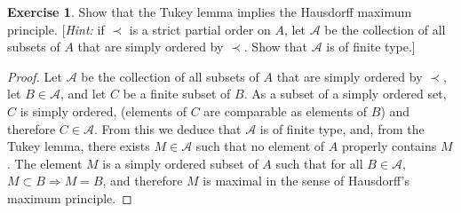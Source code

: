 \documentclass[11pt,a4paper,twoside]{article}
\theoremstyle{definition}
\newcounter{excounter}
\newtheorem{exercise}[excounter]{Exercise}
\begin{document}
\begin{exercise}

  Show that the Tukey lemma implies the Hausdorff maximum principle. [\emph{Hint:} if
  $\prec$ is a strict partial order on $A$, let $\mathscr{A}$ be the collection of all
  subsets of $A$ that are simply ordered by $\prec$. Show that $\mathscr{A}$ is of
  finite type.]

\end{exercise}

\begin{proof}

  Let $\mathscr{A}$ be the collection of all subsets of $A$ that are simply ordered by $\prec$,
  let $B \in \mathscr{A}$, and let $C$ be a finite subset of $B$.
  As a subset of a simply ordered set, $C$ is simply ordered, (elements of $C$ are comparable
  as elements of $B$) and therefore $C \in \mathscr{A}$.
  From this we deduce that $\mathscr{A}$ is of finite type, and, from the Tukey lemma,
  there exists $M \in \mathscr{A}$ such that no element of $A$ properly contains $M$.
  The element $M$ is a simply ordered subset of $A$ such that for all $B \in \mathscr{A}$,
  $M \subset B \Rightarrow M = B$, and therefore $M$ is maximal in the sense of Hausdorff's
  maximum principle.

\end{proof}
\end{document}
